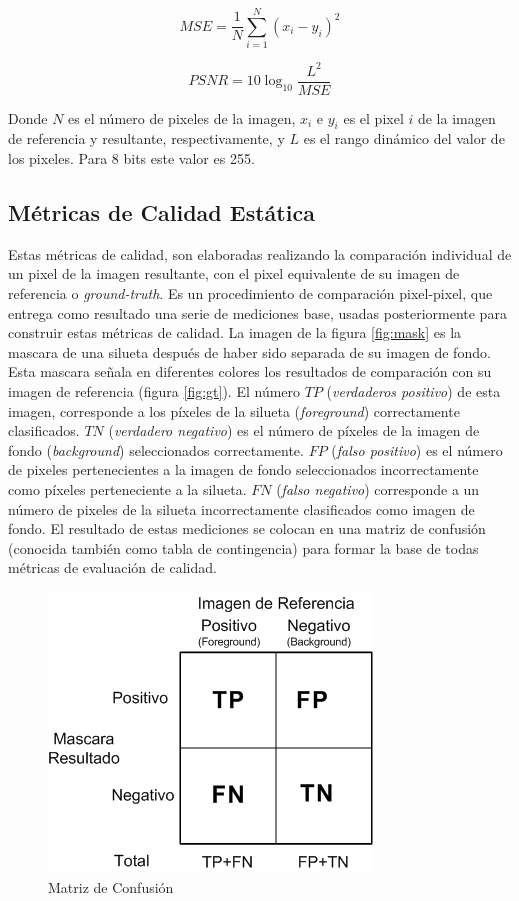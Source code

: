 \begin{equation}
MSE=\frac{1}{N}\sum_{i=1}^N(x_{i}-y_{i})^2
\end{equation}

\begin{equation}
PSNR = 10\log_{10} {\frac{L^2}{MSE}}
\end{equation}

Donde $N$ es el número de pixeles de la imagen, $x_{i}$ e $y_{i}$ es el pixel $i$ de la imagen de referencia y resultante, respectivamente, y $L$ es el rango dinámico del valor de los pixeles. Para 8 bits este valor es 255.
 

\subsection{Métricas de Calidad Estática}

Estas métricas de calidad, son elaboradas realizando la comparación individual de un pixel de la imagen resultante, con el pixel equivalente de su imagen de referencia o \emph{ground-truth}. Es un procedimiento de comparación pixel-pixel, que entrega como resultado una serie de mediciones base, usadas posteriormente para construir estas métricas de calidad. La imagen de la figura \ref{fig:mask} es la mascara de una silueta después de haber sido separada de su imagen de fondo. Esta mascara señala en diferentes colores los resultados de comparación con su imagen de referencia (figura \ref{fig:gt}). El número $TP$ (\emph{verdaderos positivo}) de esta imagen, corresponde a los píxeles de la silueta (\emph{foreground}) correctamente clasificados. $TN$ (\emph{verdadero negativo}) es el número de píxeles de la imagen de fondo (\emph{background}) seleccionados correctamente. $FP$ (\emph{falso positivo}) es el número de pixeles pertenecientes a la imagen de fondo seleccionados incorrectamente como píxeles perteneciente a la silueta. $FN$ (\emph{falso negativo}) corresponde a un número de pixeles de la silueta incorrectamente clasificados como imagen de fondo. El resultado de estas mediciones se colocan en una matriz de confusión (conocida también como tabla de contingencia) para formar la base de todas métricas de evaluación de calidad. 
\\


\begin{figure}[!ht]
\centering
\includegraphics[scale=0.6]{img/Confusion_Matrix}
\caption{Matriz de Confusión}
\label{fig:confusion_matrix}
\end{figure}

